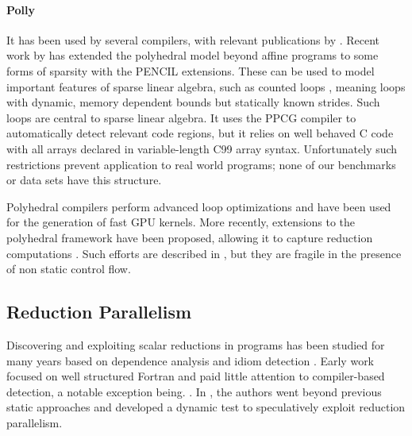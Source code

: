     \paragraph*{Polly}
    It has been used by several compilers, with relevant
    publications by \citet{redon1994scheduling, jouvelot1989unified,
    chi1997optimizing, gupta2006simplifying, stock2014framework}.
    Recent work by \citet{7429301} has extended the polyhedral model beyond
    affine programs to some forms of sparsity with the PENCIL extensions.
    These can be used to model important features of sparse linear algebra, such
    as counted loops \citep{Zhao:2018:PCF:3178372.3179509}, meaning loops with
    dynamic, memory dependent bounds but statically known strides.
    Such loops are central to sparse linear algebra.
    It uses the PPCG compiler \citep{Verdoolaege:2013:PPC:2400682.2400713} to
    automatically detect relevant code regions, but it relies on well behaved C
    code with all arrays declared in variable-length C99 array syntax.
    Unfortunately such restrictions prevent application to real world programs;
    none of our benchmarks or data sets have this structure.

    Polyhedral compilers \cite{Baskaran:2010:ACC:2175462.2175482,Verdoolaege:2013:PPC:2400682.2400713} perform advanced loop optimizations and have been used for the generation of fast GPU kernels.
    More recently, extensions to the polyhedral framework have been proposed, allowing it to capture reduction computations \cite{chi1997optimizing, gupta2006simplifying, stock2014framework}.
    Such efforts are described in \cite{Doerfert2015Polly}, but they are fragile in the presence of non static control flow.

\pagebreak
\subsection{Reduction Parallelism}

    Discovering and exploiting scalar reductions in programs has been studied
    for many years based on dependence analysis and idiom detection
    \cite{pottenger1995idiom,suganuma1996detection,fisher1994parallelizing}.
    Early work focused on well structured Fortran and paid little attention to
    compiler-based detection, a notable exception being. 
    \cite{suganuma1996detection}. 
    In \cite{rauchwerger1999lrpd}, the authors went beyond previous static
    approaches and developed a dynamic test to speculatively exploit reduction
    parallelism.

